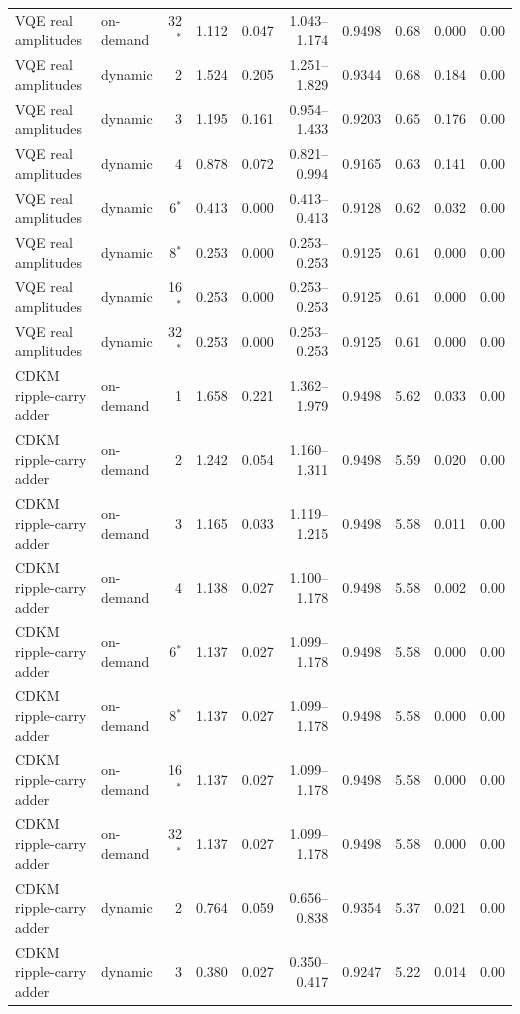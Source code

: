 {\begin{longtable}{@{}llrrrrrrrr@{}}
VQE real amplitudes & on-demand & 32$^*$ & 1.112 & 0.047 & 1.043--1.174 & 0.9498 & 0.68 & 0.000 & 0.00 \\
VQE real amplitudes & dynamic & 2 & 1.524 & 0.205 & 1.251--1.829 & 0.9344 & 0.68 & 0.184 & 0.00 \\
VQE real amplitudes & dynamic & 3 & 1.195 & 0.161 & 0.954--1.433 & 0.9203 & 0.65 & 0.176 & 0.00 \\
VQE real amplitudes & dynamic & 4 & 0.878 & 0.072 & 0.821--0.994 & 0.9165 & 0.63 & 0.141 & 0.00 \\
VQE real amplitudes & dynamic & 6$^*$ & 0.413 & 0.000 & 0.413--0.413 & 0.9128 & 0.62 & 0.032 & 0.00 \\
VQE real amplitudes & dynamic & 8$^*$ & 0.253 & 0.000 & 0.253--0.253 & 0.9125 & 0.61 & 0.000 & 0.00 \\
VQE real amplitudes & dynamic & 16$^*$ & 0.253 & 0.000 & 0.253--0.253 & 0.9125 & 0.61 & 0.000 & 0.00 \\
VQE real amplitudes & dynamic & 32$^*$ & 0.253 & 0.000 & 0.253--0.253 & 0.9125 & 0.61 & 0.000 & 0.00 \\
CDKM ripple-carry adder & on-demand & 1 & 1.658 & 0.221 & 1.362--1.979 & 0.9498 & 5.62 & 0.033 & 0.00 \\
CDKM ripple-carry adder & on-demand & 2 & 1.242 & 0.054 & 1.160--1.311 & 0.9498 & 5.59 & 0.020 & 0.00 \\
CDKM ripple-carry adder & on-demand & 3 & 1.165 & 0.033 & 1.119--1.215 & 0.9498 & 5.58 & 0.011 & 0.00 \\
CDKM ripple-carry adder & on-demand & 4 & 1.138 & 0.027 & 1.100--1.178 & 0.9498 & 5.58 & 0.002 & 0.00 \\
CDKM ripple-carry adder & on-demand & 6$^*$ & 1.137 & 0.027 & 1.099--1.178 & 0.9498 & 5.58 & 0.000 & 0.00 \\
CDKM ripple-carry adder & on-demand & 8$^*$ & 1.137 & 0.027 & 1.099--1.178 & 0.9498 & 5.58 & 0.000 & 0.00 \\
CDKM ripple-carry adder & on-demand & 16$^*$ & 1.137 & 0.027 & 1.099--1.178 & 0.9498 & 5.58 & 0.000 & 0.00 \\
CDKM ripple-carry adder & on-demand & 32$^*$ & 1.137 & 0.027 & 1.099--1.178 & 0.9498 & 5.58 & 0.000 & 0.00 \\
CDKM ripple-carry adder & dynamic & 2 & 0.764 & 0.059 & 0.656--0.838 & 0.9354 & 5.37 & 0.021 & 0.00 \\
CDKM ripple-carry adder & dynamic & 3 & 0.380 & 0.027 & 0.350--0.417 & 0.9247 & 5.22 & 0.014 & 0.00 \\

\end{longtable}}
